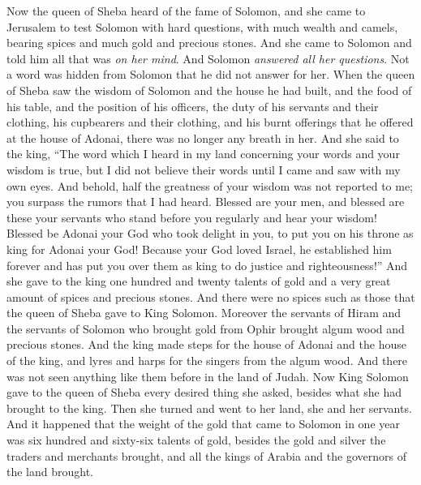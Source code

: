 \begin{biblechapter} %
 Now the queen of Sheba heard of the fame of Solomon, and she came to Jerusalem to test Solomon with hard questions, with much wealth and camels, bearing spices and much gold and precious stones. And she came to Solomon and told him all that was \textit{on her mind}.
\verse And Solomon \textit{answered all her questions}. Not a word was hidden from Solomon that he did not answer for her.
\verse When the queen of Sheba saw the wisdom of Solomon and the house he had built,
\verse and the food of his table, and the position of his officers, the duty of his servants and their clothing, his cupbearers and their clothing, and his burnt offerings that he offered at the house of Adonai, there was no longer any breath in her.
\verse And she said to the king, “The word which I heard in my land concerning your words and your wisdom is true,
\verse but I did not believe their words until I came and saw with my own eyes. And behold, half the greatness of your wisdom was not reported to me; you surpass the rumors that I had heard.
\verse Blessed are your men, and blessed are these your servants who stand before you regularly and hear your wisdom!
\verse Blessed be Adonai your God who took delight in you, to put you on his throne as king for Adonai your God! Because your God loved Israel, he established him forever and has put you over them as king to do justice and righteousness!”
\verse And she gave to the king one hundred and twenty talents of gold and a very great amount of spices and precious stones. And there were no spices such as those that the queen of Sheba gave to King Solomon.
\verse Moreover the servants of Hiram and the servants of Solomon who brought gold from Ophir brought algum wood and precious stones.
\verse And the king made steps for the house of Adonai and the house of the king, and lyres and harps for the singers from the algum wood. And there was not seen anything like them before in the land of Judah.
\verse Now King Solomon gave to the queen of Sheba every desired thing she asked, besides what she had brought to the king. Then she turned and went to her land, she and her servants.
 And it happened that the weight of the gold that came to Solomon in one year was six hundred and sixty-six talents of gold,
\verse besides the gold and silver the traders and merchants brought, and all the kings of Arabia and the governors of the land brought.

\end{biblechapter}
